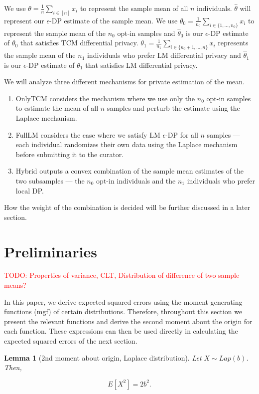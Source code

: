 \documentclass{article}
\newcommand{\todo}[1]{\textcolor{red}{TODO: {#1}}}
\theoremstyle{plain}
\newtheorem{lem}[thm]{Lemma}
\begin{document}
We use $\theta = \frac{1}{n}\sum_{i \in [n]}x_i$ to represent the sample mean of all $n$ individuals. $\hat{\theta}$ will represent our $\epsilon$-DP estimate of the sample mean. We use $\theta_0 = \frac{1}{n_0}\sum_{i \in \{1, \dots, n_0\}} x_i$ to represent the sample mean of the $n_0$ opt-in samples and $\hat{\theta}_0$ is our $\epsilon$-DP estimate of $\theta_0$ that satisfies TCM differential privacy. $\theta_1 = \frac{1}{n_1}\sum_{i \in \{n_0+1, \dots, n\}} x_i$ represents the sample mean of the $n_1$ individuals who prefer LM differential privacy and $\hat{\theta}_1$ is our $\epsilon$-DP estimate of $\theta_1$ that satisfies LM differential privacy. 

We will analyze three different mechanisms for private estimation of the mean. 
\begin{enumerate}
\item OnlyTCM considers the mechanism where we use only the $n_0$ opt-in samples to estimate the mean of all $n$ samples and perturb the estimate using the Laplace mechanism. 
\item FullLM considers the case where we satisfy LM $\epsilon$-DP for all $n$ samples — each individual randomizes their own data using the Laplace mechanism before submitting it to the curator.  
\item Hybrid outputs a convex combination of the sample mean estimates of the two subsamples — the $n_0$ opt-in individuals and the $n_1$ individuals who prefer local DP.
\end{enumerate}
How the weight of the combination is decided will be further discussed in a later section. 

\section{Preliminaries}

\todo{Properties of variance, CLT, Distribution of difference of two sample means?}

In this paper, we derive expected squared errors using the moment generating functions (mgf) of certain distributions. Therefore, throughout this section we present the relevant functions and derive the second moment about the origin for each function. These expressions can then be used directly in calculating the expected squared errors of the next section. 

\begin{lem}[2nd moment about origin, Laplace distribution]
Let $X \sim Lap(b)$. Then, 

$$E[X^2] = 2b^2.$$
\end{lem}
\end{document}
